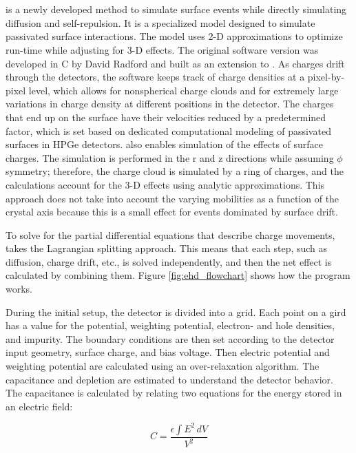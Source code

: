 \section{{\ehd}}
{\ehd} is a newly developed method to simulate surface events while directly simulating diffusion and self-repulsion. It is a specialized model designed to simulate passivated surface interactions. The model uses 2-D approximations to optimize run-time while adjusting for 3-D effects. The original software version was developed in C by David Radford and built as an extension to {\siggen}. As charges drift through the detectors, the software keeps track of charge densities at a pixel-by-pixel level, which allows for nonspherical charge clouds and for extremely large variations in charge density at different positions in the detector. The charges that end up on the surface have their velocities reduced by a predetermined factor, which is set based on dedicated computational modeling of passivated surfaces in HPGe detectors. {\ehd} also enables simulation of the effects of surface charges. The simulation is performed in the r and z directions while assuming $\phi$ symmetry; therefore, the charge cloud is simulated by a ring of charges, and the calculations account for the 3-D effects using analytic approximations. This approach does not take into account the varying mobilities as a function of the crystal axis because this is a small effect for events dominated by surface drift.

To solve for the partial differential equations that describe charge movements, {\ehd} takes the Lagrangian splitting approach. This means that each step, such as diffusion, charge drift, etc., is solved independently, and then the net effect is calculated by combining them. Figure \ref{fig:ehd_flowchart} shows how the {\ehd} program works. 

During the initial setup, the detector is divided into a grid. Each point on a gird has a value for the potential, weighting potential, electron- and hole densities, and impurity. The boundary conditions are then set according to the detector input geometry, surface charge, and bias voltage. Then electric potential and weighting potential are calculated using an over-relaxation algorithm. The capacitance and depletion are estimated to understand the detector behavior. The capacitance is calculated by relating two equations for the energy stored in an electric field:

\begin{equation}
    C = \frac{\epsilon \int E^2 \, dV}{V^2}
\end{equation}

